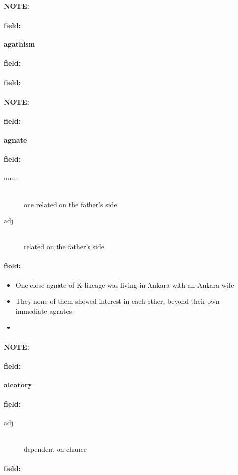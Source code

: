 \documentclass[12pt]{article}
\newenvironment{note}{\paragraph{NOTE:}}{}
\newenvironment{field}{\paragraph{field:}}{}
\begin{document}
\begin{note}
\begin{field}
\textbf{\large agathism}
\end{field}


\begin{field}
\end{field}

\begin{field}
\end{field}
\end{note}
\begin{note}
\begin{field}
\textbf{\large agnate}
\end{field}


\begin{field}
\begin{description}
\item[noun] \hfill \\ 
one related on the father's side

\item[adj] \hfill \\ 
related on the father's side

\end{description}
\end{field}

\begin{field}
\begin{itemize}
\item One close agnate of K lineage was living in Ankara with an Ankara wife
\item They none of them showed interest in each other, beyond their own immediate agnates
\item 
\end{itemize}
\end{field}
\end{note}
\begin{note}
\begin{field}
\textbf{\large aleatory}
\end{field}


\begin{field}
\begin{description}
\item[adj] \hfill \\ 
dependent on chance

\end{description}
\end{field}

\begin{field}
\end{field}
\end{note}
\end{document}
